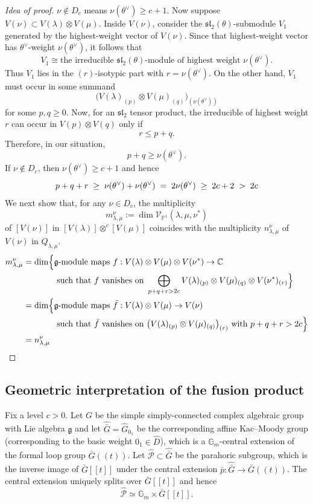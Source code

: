 \documentclass[12pt]{article}
\begin{document}
\begin{proof}
    [Idea of proof]  $\nu\notin D_c$ means
$\nu(\theta^\vee)\ge c+1$. Now suppose $V(\nu)\subset V(\lambda)\otimes V(\mu)$. Inside $V(\nu)$, consider the $\mathfrak{sl}_2(\theta)$-submodule $V_1$ generated by the highest-weight vector of $V(\nu)$. Since that highest-weight vector has $\theta^\vee$-weight $\nu(\theta^\vee)$, it follows that
\[
V_1 \cong \text{the irreducible $\mathfrak{sl}_2(\theta)$-module of highest weight } \nu(\theta^\vee).
\]
Thus $V_1$ lies in the $(r)$-isotypic part with $r=\nu(\theta^\vee)$. On the other hand, $V_1$ must occur in some summand
\[
\bigl(V(\lambda)_{(p)}\otimes V(\mu)_{(q)}\bigr)_{(\nu(\theta^\vee))}
\]
for some $p,q\ge 0$. Now, for an $\mathfrak{sl}_2$ tensor product, the irreducible of highest weight $r$ can occur in $V(p)\otimes V(q)$ only if
\[
r\le p+q.
\]
Therefore, in our situation,
\[
p+q\ge \nu(\theta^\vee).
\] If $\nu\notin D_c$, then $\nu(\theta^\vee)\ge c+1$ and hence
\[
p+q+r
\;\ge\;
\nu(\theta^\vee)+\nu(\theta^\vee)
\;=\;
2\nu(\theta^\vee)
\;\ge\;
2c+2
\;>\;
2c \qedhere
\]
We next show that, for any $\nu \in D_c$, the multiplicity 
\[
m_{\lambda,\mu}^\nu := \dim \mathcal V_{\mathbb P^1}(\lambda,\mu,\nu^*)
\]
of $[V(\nu)]$ in $[V(\lambda)] \otimes^c [V(\mu)]$ coincides with the multiplicity 
$n_{\lambda,\mu}^\nu$ of $V(\nu)$ in $Q_{\lambda,\mu}$.
\begin{align*}
m_{\lambda,\mu}^\nu
&= \dim \Bigl\{
\text{$\mathfrak g$-module maps } 
f : V(\lambda)\otimes V(\mu)\otimes V(\nu^*) \to \mathbb C \\
&\qquad\qquad\text{such that $f$ vanishes on }
\bigoplus_{p+q+r>2c}
V(\lambda)_{(p)} \otimes V(\mu)_{(q)} \otimes V(\nu^*)_{(r)}
\Bigr\} \\
&= \dim \Bigl\{
\text{$\mathfrak g$-module maps } 
\bar f : V(\lambda)\otimes V(\mu) \to V(\nu) \\
&\qquad\qquad\text{such that $\bar f$ vanishes on }
\bigl(V(\lambda)_{(p)} \otimes V(\mu)_{(q)}\bigr)_{(r)}
\text{ with } p+q+r>2c
\Bigr\} \\
&= n_{\lambda,\mu}^\nu
\end{align*}
\end{proof}

\subsection{Geometric interpretation of the fusion product}
Fix a level $c>0$. Let $G$ be the simple simply-connected complex algebraic group with Lie algebra $\mathfrak g$ and let $\widehat{\bar G}=\widehat{G}_{0_1}$ be the corresponding affine Kac--Moody group (corresponding to the basic weight $0_1\in \widehat D$), which is a $\mathbb G_m$-central extension of the formal loop group $\bar G((t))$. Let $\widehat{\mathcal P}\subset \widehat{\bar G}$ be the parahoric subgroup, which is the inverse image of $\bar G[[t]]$ under the central extension $\bar p:\widehat{\bar G}\to \bar G((t))$. The central extension uniquely splits over $\bar G[[t]]$ and hence
\[
\widehat{\mathcal P}\simeq \mathbb G_m \times \bar G[[t]].
\]
\end{document}
